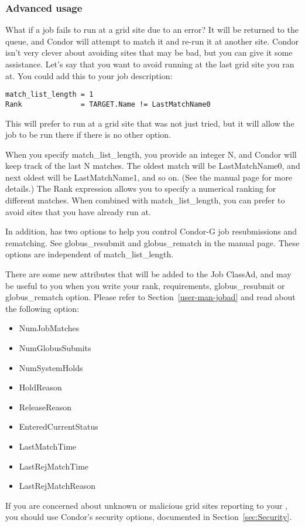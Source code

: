 \subsubsection{Advanced usage}

What if a job fails to run at a grid site due to an error? It will be
returned to the queue, and Condor will attempt to match it and
re-run it at another site. Condor isn't very clever about avoiding
sites that may be bad, but you can give it some assistance. Let's say
that you want to avoid running at the last grid site you ran at. You
could add this to your job description:

\footnotesize
\begin{verbatim}
match_list_length = 1
Rank              = TARGET.Name != LastMatchName0
\end{verbatim}
\normalsize

This will prefer to run at a grid site that was not just tried, but it
will allow the job to be run there if there is no other option. 

When you specify match\_list\_length, you provide an integer N, and
Condor will keep track of the last N matches. The oldest match will be
LastMatchName0, and next oldest will be LastMatchName1, and so on. (See
the  manual page for more details.) The Rank expression
allows you to specify a numerical ranking for different matches. When
combined with match\_list\_length, you can prefer to avoid sites that
you have already run at. 

In addition,  has two options to help you control
Condor-G job resubmissions and rematching.  See globus\_resubmit and
globus\_rematch in the  manual page. These options are
independent of match\_list\_length.

There are some new attributes that will be added to the Job ClassAd,
and may be useful to you when you write your rank, requirements,
globus\_resubmit or globus\_rematch option. Please refer to
Section~\ref{user-man-jobad} and read about the following option:

\begin{itemize}
\item NumJobMatches
\item NumGlobusSubmits
\item NumSystemHolds
\item HoldReason
\item ReleaseReason
\item EnteredCurrentStatus
\item LastMatchTime
\item LastRejMatchTime
\item LastRejMatchReason
\end{itemize}

If you are concerned about unknown or malicious grid sites reporting
to your , you should use Condor's security options,
documented in Section~\ref{sec:Security}.
